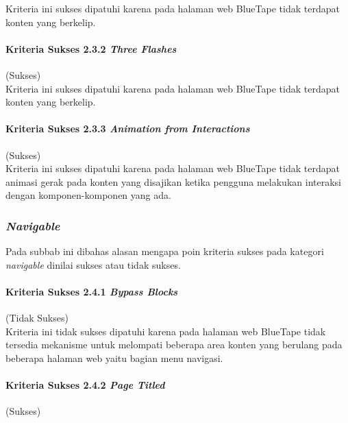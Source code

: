 Kriteria ini sukses dipatuhi karena pada halaman web BlueTape tidak terdapat konten yang berkelip.

\paragraph{Kriteria Sukses 2.3.2 \textit{Three Flashes}}
\label{par:kepatuhan_bluetape_kriteria_sukses_2.3.2}
(Sukses)\\

Kriteria ini sukses dipatuhi karena pada halaman web BlueTape tidak terdapat konten yang berkelip.

\paragraph{Kriteria Sukses 2.3.3 \textit{Animation from Interactions}}
\label{par:kepatuhan_bluetape_kriteria_sukses_2.3.3}
(Sukses)\\

Kriteria ini sukses dipatuhi karena pada halaman web BlueTape tidak terdapat animasi gerak pada konten yang disajikan ketika pengguna melakukan interaksi dengan komponen-komponen yang ada.

\subsubsection{\textit{Navigable}}
\label{subsubsec:kepatuhan_bluetape_navigable}
Pada subbab ini dibahas alasan mengapa poin kriteria sukses pada kategori \textit{navigable} dinilai sukses atau tidak sukses.

\paragraph{Kriteria Sukses 2.4.1 \textit{Bypass Blocks}}
\label{par:kepatuhan_bluetape_kriteria_sukses_2.4.1}
(Tidak Sukses)\\

Kriteria ini tidak sukses dipatuhi karena pada halaman web BlueTape tidak tersedia mekanisme untuk melompati beberapa area konten yang berulang pada beberapa halaman web yaitu bagian menu navigasi.

\paragraph{Kriteria Sukses 2.4.2 \textit{Page Titled}}
\label{par:kepatuhan_bluetape_kriteria_sukses_2.4.2}
(Sukses)\\

